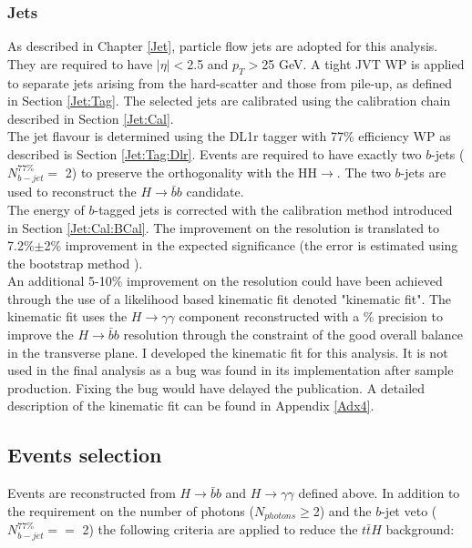 \subsubsection{Jets}
\label{HHyybb:ObjEvt:Obj:Jet}
As described in Chapter \ref{Jet}, particle flow jets are adopted for this analysis. They are required to have $|\eta| < $2.5 and $p_T > $25 GeV. A tight JVT WP is applied to separate jets arising from the hard-scatter and those from pile-up, as defined in Section \ref{Jet:Tag}. The selected jets are calibrated using the calibration chain described in Section \ref{Jet:Cal}. \\

The jet flavour is determined using the DL1r tagger with 77\% efficiency WP as described is Section \ref{Jet:Tag:Dlr}. Events are required to have exactly two $b$-jets ($N_{b-jet}^{77\%} = $ 2) to preserve the orthogonality with the HH$\to$\bbbb. The two $b$-jets are used to reconstruct the $H\to\bar{b}b$ candidate. \\
The energy of $b$-tagged jets is corrected with the calibration method introduced in Section \ref{Jet:Cal:BCal}. The improvement on the \mbb resolution is translated to 7.2\%$\pm$2\% improvement in the expected significance (the error is estimated using the bootstrap method \cite{Bootstrap}). \\
An additional 5-10\% improvement on the \mbb resolution could have been achieved through the use of a likelihood based kinematic fit denoted "kinematic fit". The kinematic fit uses the $H\to\gamma\gamma$ component reconstructed with a \% precision to improve the $H\to\bar{b}b$ resolution through the constraint of the good overall balance in the transverse plane. I developed the kinematic fit for this \HHyybb analysis. It is not used in the final analysis as a bug was found in its implementation after sample production. Fixing the bug would have delayed the publication. A detailed description of the kinematic fit can be found in Appendix \ref{Adx4}. \\


\subsection{Events selection}
\label{HHyybb:ObjEvt:Evt}
Events are reconstructed from $H\to\bar{b}b$ and $H\to\gamma\gamma$ defined above. In addition to the requirement on the number of photons ($N_{photons} \geq $2) and the $b$-jet veto ($N_{b-jet}^{77\%} == $ 2) the following criteria are applied to reduce the $t\bar{t}H$ background: 

